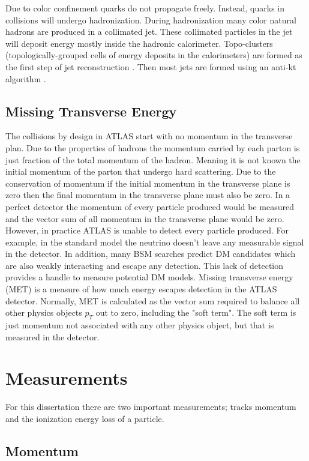 Due to color confinement quarks do not propagate freely. Instead, quarks in \pp collisions will undergo hadronization. During hadronization many color natural hadrons are produced in a collimated jet. These collimated particles in the jet will deposit energy mostly inside the hadronic calorimeter. Topo-clusters (topologically-grouped cells of energy deposits in the calorimeters) are formed as the first step of jet reconstruction \cite{Schramm:2291608}. Then most jets are formed using an anti-kt algorithm \cite{Cacciari_2008}. 



\subsection{Missing Transverse Energy}
The \pp collisions by design in ATLAS start with no momentum in the transverse plan. Due to the properties of hadrons the momentum carried by each parton is just fraction of the total momentum of the hadron. Meaning it is not known the initial momentum of the parton that undergo hard scattering. 
Due to the conservation of momentum if the initial momentum in the transverse plane is zero then the final momentum in the transverse plane must also be zero. In a perfect detector the momentum of every particle produced would be measured and the vector sum of all momentum in the transverse plane would be zero. 
However, in practice ATLAS is unable to detect every particle produced. For example, in the standard model the neutrino doesn't leave any measurable signal in the detector. 
In addition, many BSM searches predict DM candidates which are also weakly interacting and escape any detection. This lack of detection provides a handle to measure potential DM models. 
Missing transverse energy (MET) is a measure of how much energy escapes detection in the ATLAS detector. Normally, MET is calculated as the vector sum required to balance all other physics objects $p_T$ out to zero, including the "soft term". The soft term is just momentum not associated with any other physics object, but that is measured in the detector. 

\section{Measurements}
For this dissertation there are two important measurements; tracks momentum and the ionization energy loss of a particle. 

\subsection{Momentum}
\label{sec:sagitta}


